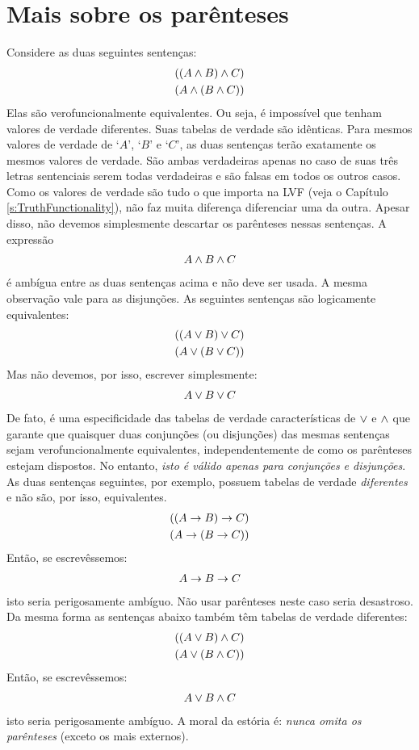 \section{Mais sobre os parênteses}\label{s:MoreBracketingConventions}
Considere as duas seguintes sentenças:
	\begin{align*}
		((A \wedge B) \wedge C)\\
		(A \wedge (B \wedge C))
	\end{align*}
Elas são verofuncionalmente equivalentes.
Ou seja, é impossível que tenham valores de verdade diferentes.
Suas tabelas de verdade são idênticas.
Para mesmos valores de verdade de `$A$', `$B$' e `$C$', as duas sentenças terão exatamente os mesmos valores de verdade.
São ambas verdadeiras apenas no caso de suas três letras sentenciais serem todas verdadeiras e são falsas em todos os outros casos.
Como os valores de verdade são tudo o que importa na LVF (veja o Capítulo \ref{s:TruthFunctionality}), não faz muita diferença diferenciar uma da outra.
Apesar disso, não devemos simplesmente descartar os parênteses nessas sentenças.
A expressão
	\begin{align*}
		A \wedge B \wedge C
	\end{align*}
é ambígua entre as duas sentenças acima e não deve ser usada.
A mesma observação vale para as disjunções.
As seguintes sentenças são logicamente equivalentes:
	\begin{align*}
		((A \vee B) \vee C)\\
		(A \vee (B \vee C))
	\end{align*}
Mas não devemos, por isso, escrever simplesmente:
	\begin{align*}
		A \vee B \vee C
	\end{align*}
De fato, é uma especificidade das tabelas de verdade características de $\vee$ e $\wedge$ que garante que quaisquer duas conjunções (ou disjunções) das mesmas sentenças sejam verofuncionalmente equivalentes, independentemente de como os parênteses estejam dispostos.
No entanto, \emph{isto é válido apenas para conjunções e disjunções}.
As duas sentenças seguintes, por exemplo, possuem tabelas de verdade \emph{diferentes} e não são, por isso, equivalentes.
	\begin{align*}
		((A \rightarrow B) \rightarrow C)\\
		(A \rightarrow (B \rightarrow C))
	\end{align*}
Então, se escrevêssemos:
	\begin{align*}
		A \rightarrow B \rightarrow C
	\end{align*}
isto seria perigosamente ambíguo.
Não usar parênteses neste caso seria desastroso.
Da mesma forma as sentenças abaixo também têm tabelas de verdade diferentes:
	\begin{align*}
		((A \vee B) \wedge C)\\
		(A \vee (B \wedge C))
	\end{align*}
Então, se escrevêssemos:
	\begin{align*}
		A \vee B \wedge C
	\end{align*}
isto seria perigosamente ambíguo.
A moral da estória é: \emph{nunca omita os parênteses} (exceto os mais externos).


